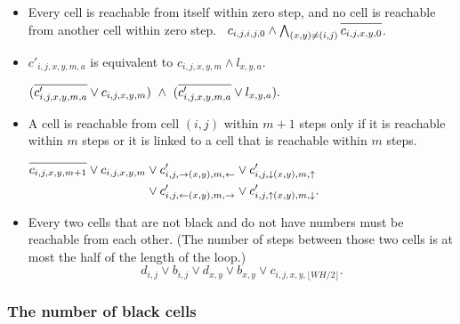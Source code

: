 \documentclass[a4paper]{article}
\newcommand{\N}[1]{\overline{#1\vphantom{l}}}
\renewcommand{\L}{{\leftarrow}}
\newcommand{\R}{{\rightarrow}}
\newcommand{\U}{{\uparrow}}
\newcommand{\D}{{\downarrow}}
\begin{document}
\begin{itemize}
\item
  Every cell is reachable from itself within zero step, and
  no cell is reachable from another cell within zero step. \
  $c_{i,j,i,j,0}\land \bigwedge_{(x,y)\ne(i,j)} \N{c_{i,j,x,y,0}}$.

\item
  $c'_{i,j,x,y,m,a}$ is equivalent to $c_{i,j,x,y,m}\land l_{x,y,a}$.
  \par\qquad
  $
   (\N{c'_{i,j,x,y,m,a}}\lor{c_{i,j,x,y,m}})\ {}\land{}\
   (\N{c'_{i,j,x,y,m,a}}\lor{l_{x,y,a}}).
   $

\item
  A cell is reachable from cell $(i,j)$ within $m+1$ steps
  only if it is reachable within $m$ steps or
  it is linked to a cell that is reachable within $m$ steps.
   \par\qquad
     $\begin{alignedat}[t]{2}
      \N{c_{i,j,x,y,m+1}}\lor
      c_{i,j,x,y,m} &\lor
      c'_{i,j,\R(x,y),m,\L} &&\lor
      c'_{i,j,\D(x,y),m,\U} \\ &\lor
      c'_{i,j,\L(x,y),m,\R} &&\lor
      c'_{i,j,\U(x,y),m,\D}.
      \end{alignedat}$

\item
  Every two cells that are not black and do not have numbers
  must be reachable from each other.
  (The number of steps between those two cells
  is at most the half of the length of the loop.)
  \begin{equation}
   d_{i,j}\lor b_{i,j}\lor
   d_{x,y}\lor b_{x,y}\lor
   c_{i,j,x,y,\lfloor WH/2\rfloor}.
   \label{eq:reachability}
  \end{equation}
\end{itemize}

\subsubsection{The number of black cells}
\end{document}
